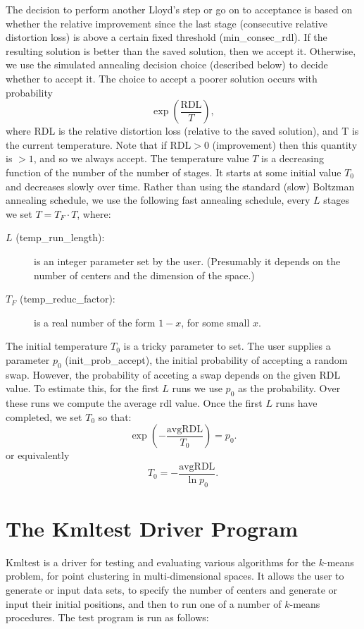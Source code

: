 \documentclass[11pt]{article}		%
\begin{document}
The decision to perform another Lloyd's step or go on to acceptance is
based on whether the relative improvement since the last stage
(consecutive relative distortion loss) is above a certain fixed
threshold (min\_consec\_rdl).  If the resulting solution is better than
the saved solution, then we accept it.  Otherwise, we use the simulated
annealing decision choice (described below) to decide whether to accept
it.  The choice to accept a poorer solution occurs with probability
\[
	\exp \left( \frac{\mbox{RDL}}{T} \right),
\]
where RDL is the relative distortion loss (relative to the saved
solution), and T is the current temperature.  Note that if $\mbox{RDL} >
0$ (improvement) then this quantity is $> 1$, and so we always accept.
The temperature value $T$ is a decreasing function of the number of the
number of stages.  It starts at some initial value $T_0$ and decreases
slowly over time.  Rather than using the standard (slow) Boltzman
annealing schedule, we use the following fast annealing schedule, every
$L$ stages we set $T = T_F \cdot T$, where:
\begin{description}
\item[$L$ (temp\_run\_length):] is an integer parameter set by the
	user.  (Presumably it depends on the number of centers and
	the dimension of the space.)
\item[$T_F$ (temp\_reduc\_factor):] is a real number of the form
	$1-x$, for some small $x$.
\end{description}

The initial temperature $T_0$ is a tricky parameter to set.  The user
supplies a parameter $p_0$ (init\_prob\_accept), the initial probability
of accepting a random swap.  However, the probability of acceting a swap
depends on the given RDL value.  To estimate this, for the first $L$
runs we use $p_0$ as the probability.  Over these runs we compute the
average rdl value.  Once the first $L$ runs have completed, we set $T_0$
so that:
\[
	\exp \left( -\frac{\mbox{avgRDL}}{T_0} \right) = p_0.
\]
or equivalently
\[
	T_0 = -\frac{\mbox{avgRDL}}{\ln p_0}.
\]

\section{The Kmltest Driver Program}

Kmltest is a driver for testing and evaluating various algorithms for
the $k$-means problem, for point clustering in multi-dimensional spaces.
It allows the user to generate or input data sets, to specify the number
of centers and generate or input their initial positions, and then to
run one of a number of $k$-means procedures.  The test program is run as
follows:
\end{document}
